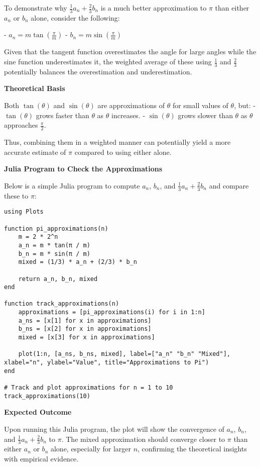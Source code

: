 \documentclass{article}
\begin{document}
To demonstrate why \( \frac{1}{3}a_n + \frac{2}{3}b_n \) is a much better approximation to \( \pi \) than either \( a_n \) or \( b_n \) alone, consider the following:

- \( a_n = m \tan \left(\frac{\pi}{m}\right) \)
- \( b_n = m \sin \left(\frac{\pi}{m}\right) \)

Given that the tangent function overestimates the angle for large angles while the sine function underestimates it, the weighted average of these using \( \frac{1}{3} \) and \( \frac{2}{3} \) potentially balances the overestimation and underestimation.

\textbf{Theoretical Basis}

Both \( \tan(\theta) \) and \( \sin(\theta) \) are approximations of \( \theta \) for small values of \( \theta \), but:
- \( \tan(\theta) \) grows faster than \( \theta \) as \( \theta \) increases.
- \( \sin(\theta) \) grows slower than \( \theta \) as \( \theta \) approaches \( \frac{\pi}{2} \).

Thus, combining them in a weighted manner can potentially yield a more accurate estimate of \( \pi \) compared to using either alone.

\textbf{Julia Program to Check the Approximations}

Below is a simple Julia program to compute \( a_n \), \( b_n \), and \( \frac{1}{3}a_n + \frac{2}{3}b_n \) and compare these to \( \pi \):

\begin{verbatim}
using Plots

function pi_approximations(n)
    m = 2 * 2^n
    a_n = m * tan(π / m)
    b_n = m * sin(π / m)
    mixed = (1/3) * a_n + (2/3) * b_n
    
    return a_n, b_n, mixed
end

function track_approximations(n)
    approximations = [pi_approximations(i) for i in 1:n]
    a_ns = [x[1] for x in approximations]
    b_ns = [x[2] for x in approximations]
    mixed = [x[3] for x in approximations]

    plot(1:n, [a_ns, b_ns, mixed], label=["a_n" "b_n" "Mixed"], xlabel="n", ylabel="Value", title="Approximations to Pi")
end

# Track and plot approximations for n = 1 to 10
track_approximations(10)
\end{verbatim}

\textbf{Expected Outcome}

Upon running this Julia program, the plot will show the convergence of \( a_n \), \( b_n \), and \( \frac{1}{3}a_n + \frac{2}{3}b_n \) to \( \pi \). The mixed approximation should converge closer to \( \pi \) than either \( a_n \) or \( b_n \) alone, especially for larger \( n \), confirming the theoretical insights with empirical evidence.
\end{document}
